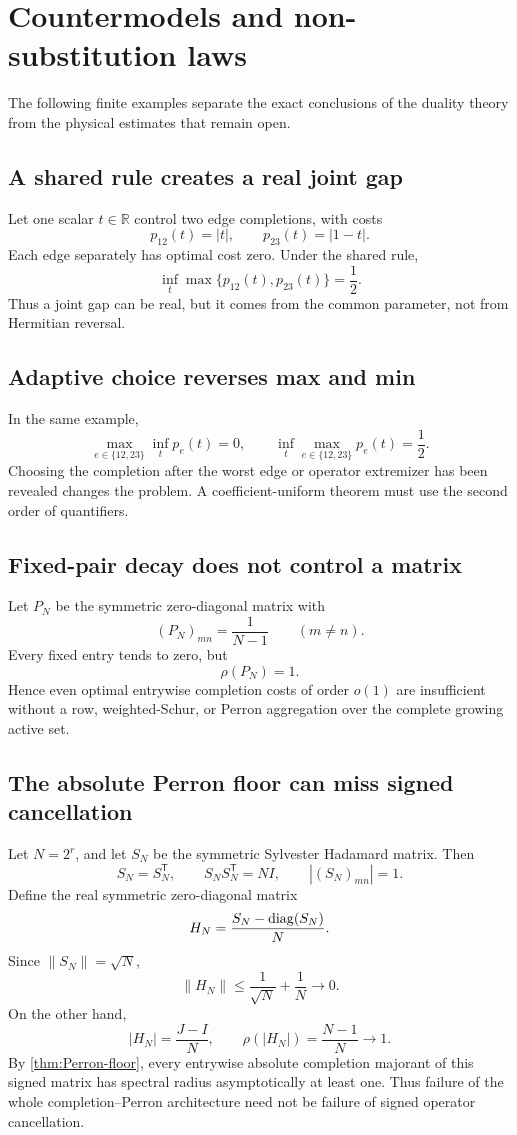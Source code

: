 \section{Countermodels and non-substitution laws}
\label{sec:countermodels}

The following finite examples separate the exact conclusions of the
duality theory from the physical estimates that remain open.

\subsection{A shared rule creates a real joint gap}

Let one scalar \(t\in\mathbb R\) control two edge completions, with costs
\[
 p_{12}(t)=|t|,
 \qquad
 p_{23}(t)=|1-t|.
\]
Each edge separately has optimal cost zero.  Under the shared rule,
\[
 \inf_t\max\{p_{12}(t),p_{23}(t)\}
 =
 \frac12.
\]
Thus a joint gap can be real, but it comes from the common parameter,
not from Hermitian reversal.

\subsection{Adaptive choice reverses max and min}

In the same example,
\[
 \max_{e\in\{12,23\}}\inf_t p_e(t)=0,
 \qquad
 \inf_t\max_{e\in\{12,23\}}p_e(t)=\frac12.
\]
Choosing the completion after the worst edge or operator extremizer has
been revealed changes the problem.  A coefficient-uniform theorem must
use the second order of quantifiers.

\subsection{Fixed-pair decay does not control a matrix}

Let \(P_N\) be the symmetric zero-diagonal matrix with
\[
 (P_N)_{mn}=\frac1{N-1}\qquad(m\ne n).
\]
Every fixed entry tends to zero, but
\[
 \rho(P_N)=1.
\]
Hence even optimal entrywise completion costs of order \(o(1)\) are
insufficient without a row, weighted-Schur, or Perron aggregation over
the complete growing active set.

\subsection{The absolute Perron floor can miss signed cancellation}

Let \(N=2^r\), and let \(S_N\) be the symmetric Sylvester Hadamard matrix.
Then
\[
 S_N=S_N^{\mathsf T},
 \qquad
 S_NS_N^{\mathsf T}=NI,
 \qquad
 |(S_N)_{mn}|=1.
\]
Define the real symmetric zero-diagonal matrix
\[
 H_N=\frac{S_N-\operatorname{diag}(S_N)}{N}.
\]
Since \(\|S_N\|=\sqrt N\),
\[
 \|H_N\|
 \le
 \frac1{\sqrt N}+\frac1N
 \longrightarrow0.
\]
On the other hand,
\[
 |H_N|=\frac{J-I}{N},
 \qquad
 \rho(|H_N|)=\frac{N-1}{N}\longrightarrow1.
\]
By \cref{thm:Perron-floor}, every entrywise absolute completion majorant
of this signed matrix has spectral radius asymptotically at least one.
Thus failure of the whole completion--Perron architecture need not be
failure of signed operator cancellation.

